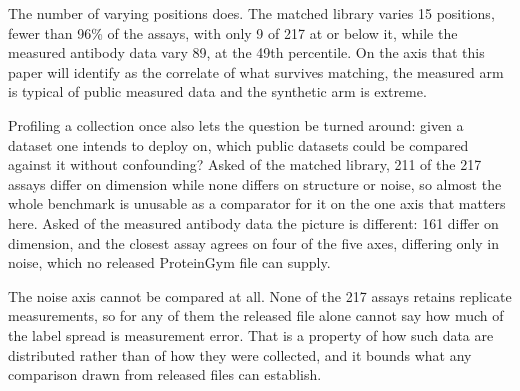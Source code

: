 \documentclass[11pt,a4paper]{article}
\begin{document}
The number of varying positions does. The matched library varies 15 positions,
fewer than 96\% of the assays, with only 9 of 217 at or below it, while the
measured antibody data vary 89, at the 49th percentile. On the axis that this
paper will identify as the correlate of what survives matching, the measured
arm is typical of public measured data and the synthetic arm is extreme.

Profiling a collection once also lets the question be turned around: given a
dataset one intends to deploy on, which public datasets could be compared
against it without confounding? Asked of the matched library, 211 of the 217
assays differ on dimension while none differs on structure or noise, so almost
the whole benchmark is unusable as a comparator for it on the one axis that
matters here. Asked of the measured antibody data the picture is different:
161 differ on dimension, and the closest assay agrees on four of the five axes,
differing only in noise, which no released ProteinGym file can supply.

The noise axis cannot be compared at all. None of the 217 assays retains
replicate measurements, so for any of them the released file alone cannot say
how much of the label spread is measurement error. That is a property of how
such data are distributed rather than of how they were collected, and it bounds
what any comparison drawn from released files can establish.
\end{document}
